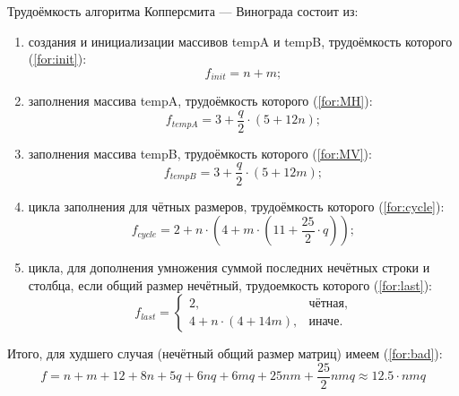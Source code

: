 Трудоёмкость алгоритма Копперсмита — Винограда состоит из:
\begin{enumerate}
    \item создания и инициализации массивов tempA и tempB, трудоёмкость которого (\ref{for:init}):
        \begin{equation}
            \label{for:init}
        f_{init} = n + m;
        \end{equation}

    \item заполнения массива tempA, трудоёмкость которого (\ref{for:MH}):
        \begin{equation}
            \label{for:MH}
        f_{tempA} = 3 + \frac{q}{2} \cdot (5 + 12n);
        \end{equation}

    \item заполнения массива tempB, трудоёмкость которого (\ref{for:MV}):
        \begin{equation}
            \label{for:MV}
        f_{tempB} = 3 + \frac{q}{2} \cdot (5 + 12m);
        \end{equation}

    \item цикла заполнения для чётных размеров, трудоёмкость которого (\ref{for:cycle}):
        \begin{equation}
            \label{for:cycle}
        f_{cycle} = 2 + n \cdot (4 + m \cdot (11 + \frac{25}{2} \cdot q));
        \end{equation}

    \item цикла, для дополнения умножения суммой последних нечётных строки и столбца, если общий размер нечётный, трудоемкость которого (\ref{for:last}):
        \begin{equation}
            \label{for:last}
            f_{last} = \begin{cases}
                2, & \text{чётная,}\\
                4 + n \cdot (4 + 14m), & \text{иначе.}
            \end{cases}
        \end{equation}
\end{enumerate}

Итого, для худшего случая (нечётный общий размер матриц) имеем (\ref{for:bad}):
\begin{equation}
    \label{for:bad}
    f = n + m + 12 + 8n + 5q + 6nq + 6mq + 25nm + \frac{25}{2}nmq \approx 12.5 \cdot nmq
\end{equation}

